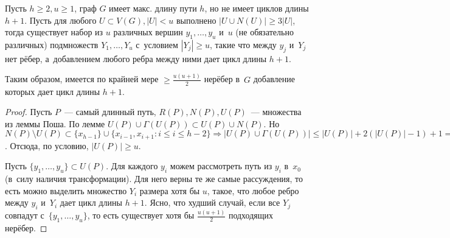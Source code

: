\documentclass{article}
\begin{document}
\begin{lemma}
	Пусть $h \ge 2, u \ge 1$, граф $G$ имеет макс. длину пути $h$, но не имеет циклов длины $h + 1$.
	Пусть для любого $U \subset V(G), |U| < u$ выполнено $|U \cup N(U)| \ge 3|U|$, тогда существует
	набор из $u$ различных вершин $y_1, \ldots, y_u$ и~$u$ (не обязательно различных) подмножеств
	$Y_1, \ldots, Y_u$ с~условием $|Y_j| \ge u$, такие что между $y_j$ и~$Y_j$ нет рёбер,
	а~добавлением любого ребра между ними дает цикл длины $h + 1$.

	Таким образом, имеется по крайней мере $\ge \frac{u(u+1)}{2}$ нерёбер в~$G$ добавление которых
	дает цикл длины $h + 1$.
\end{lemma}
\begin{proof}
	Пусть $P$~--- самый длинный путь, $R(P), N(P), U(P)$~--- множества из леммы Поша. По лемме $U(P)
	\cup \Gamma(U(P)) \subset U(P) \cup N(P)$. Но $N(P) \setminus U(P) \subset
	\{x_{h-1}\} \cup \{x_{i-1}, x_{i+1}: i \le i \le h - 2\} \Rightarrow |U(P) \cup \Gamma(U(P))| \le
	|U(P)| + 2(|U(P)| - 1) + 1 = 3|U(P)| - 1 < 3|U(P)|$. Отсюда, по условию, $|U(P)| \ge u$.

	Пусть $\{y_1, \ldots, y_u\} \subset U(P)$. Для каждого $y_i$ можем рассмотреть путь из $y_i$
	в~$x_0$ (в~силу наличия трансформации). Для него верны те же самые рассуждения, то есть можно
	выделить множество $Y_i$ размера хотя бы $u$, такое, что любое ребро между $y_i$ и~$Y_i$ дает цикл
	длины $h + 1$. Ясно, что худший случай, если все $Y_j$ совпадут с~$\{y_1, \ldots, y_u\}$, то есть
	существует хотя бы $\frac{u(u+1)}{2}$ подходящих нерёбер.
\end{proof}
\end{document}
